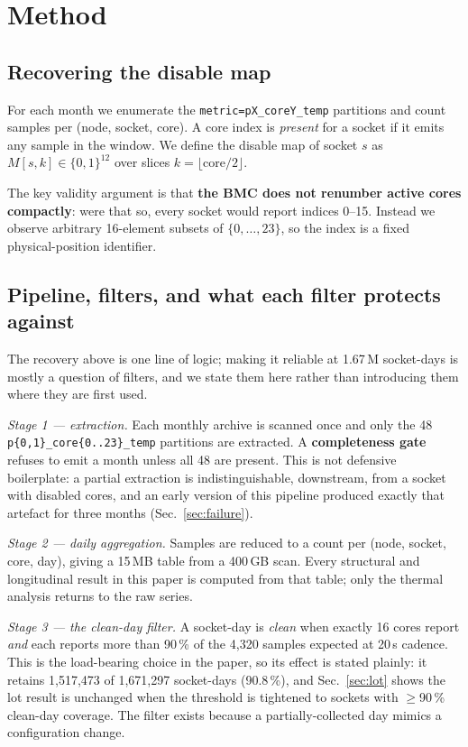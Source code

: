 \documentclass[10pt,conference]{IEEEtran}
\begin{document}
\section{Method}
\label{sec:method}
\subsection{Recovering the disable map}
For each month we enumerate the \texttt{metric=pX\_coreY\_temp} partitions and count samples per
(node, socket, core). A core index is \emph{present} for a socket if it emits any sample in the
window. We define the disable map of socket $s$ as $M[s,k]\in\{0,1\}^{12}$ over slices
$k=\lfloor \mathrm{core}/2 \rfloor$.

The key validity argument is that \textbf{the BMC does not renumber active cores compactly}: were
that so, every socket would report indices 0--15. Instead we observe arbitrary 16-element subsets
of $\{0,\dots,23\}$, so the index is a fixed physical-position identifier.

\subsection{Pipeline, filters, and what each filter protects against}
\label{sec:pipeline}
The recovery above is one line of logic; making it reliable at 1.67\,M socket-days is mostly a
question of filters, and we state them here rather than introducing them where they are first used.

\emph{Stage 1 --- extraction.} Each monthly archive is scanned once and only the 48
\texttt{p\{0,1\}\_core\{0..23\}\_temp} partitions are extracted. A \textbf{completeness gate}
refuses to emit a month unless all 48 are present. This is not defensive boilerplate: a partial
extraction is indistinguishable, downstream, from a socket with disabled cores, and an early
version of this pipeline produced exactly that artefact for three months (Sec.~\ref{sec:failure}).

\emph{Stage 2 --- daily aggregation.} Samples are reduced to a count per (node, socket, core,
day), giving a 15\,MB table from a 400\,GB scan. Every structural and longitudinal result in this
paper is computed from that table; only the thermal analysis returns to the raw series.

\emph{Stage 3 --- the clean-day filter.} A socket-day is \emph{clean} when exactly 16 cores report
\emph{and} each reports more than 90\,\% of the 4{,}320 samples expected at 20\,s cadence. This
is the load-bearing choice in the paper, so its effect is stated plainly: it retains
1{,}517{,}473 of 1{,}671{,}297 socket-days (90.8\,\%), and Sec.~\ref{sec:lot} shows the lot
result is unchanged when the threshold is tightened to sockets with $\ge$90\,\% clean-day
coverage. The filter exists because a partially-collected day mimics a configuration change.
\end{document}
